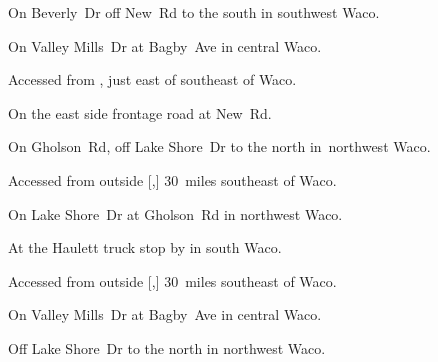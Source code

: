 
\begin{LocationList}

On Beverly~Dr off New~Rd to the south in southwest Waco.

On  Valley Mills~Dr at Bagby~Ave in central Waco.

Accessed from , just east of  southeast of Waco.

On the east side  frontage road at New~Rd.

On  Gholson~Rd, off  Lake Shore~Dr to the north in~northwest Waco.

Accessed from  outside [,] 30~miles southeast of Waco.

On  Lake Shore~Dr at  Gholson~Rd in northwest Waco.

At the Haulett truck stop by   in south Waco.

Accessed from  outside [,] 30~miles southeast of Waco.

On  Valley Mills~Dr at Bagby~Ave in central Waco.

Off  Lake Shore~Dr to the north in northwest Waco.

\end{LocationList}
